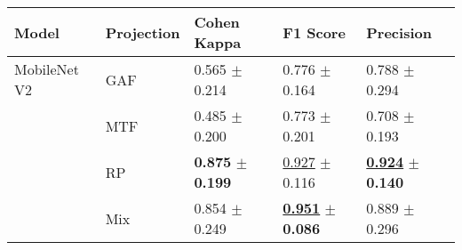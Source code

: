 
\begin{tabular}[t]{lllll}
\toprule
Model & Projection & Cohen Kappa & F1 Score & Precision \\
\midrule
MobileNet V2 & GAF & \textcolor[rgb]{0.7938511327,0.2061488673,0}{0.565} $\pm$ \textcolor[rgb]{0.2952684545,0.5000000000,0}{0.214} & \textcolor[rgb]{0.9821283509,0.0178716491,0}{0.776} $\pm$ \textcolor[rgb]{0.6787537060,0.3212462940,0}{0.164} & \textcolor[rgb]{0.6304985337,0.3695014663,0}{0.788} $\pm$ \textcolor[rgb]{0.9899538679,0.0100461321,0}{0.294} \\
 & MTF & \textcolor[rgb]{1.0000000000,0.0000000000,0}{0.485} $\pm$ \textcolor[rgb]{0.0127390111,0.5000000000,0}{0.200} & \textcolor[rgb]{1.0000000000,0.0000000000,0}{0.773} $\pm$ \textcolor[rgb]{1.0000000000,0.0000000000,0}{0.201} & \textcolor[rgb]{1.0000000000,0.0000000000,0}{0.708} $\pm$ \textcolor[rgb]{0.3412279401,0.5000000000,0}{0.193} \\
 & RP & \textbf{\textcolor[rgb]{0.0000000000,0.5000000000,0}{0.875}} $\pm$ \textbf{\textcolor[rgb]{0.0000000000,0.5000000000,0}{0.199}} & \underline{\textcolor[rgb]{0.1332250203,0.5000000000,0}{0.927}} $\pm$ \textcolor[rgb]{0.2595217982,0.5000000000,0}{0.116} & \underline{\textbf{\textcolor[rgb]{0.0000000000,0.5000000000,0}{0.924}}} $\pm$ \textbf{\textcolor[rgb]{0.0000000000,0.5000000000,0}{0.140}} \\
 & Mix & \textcolor[rgb]{0.0533980583,0.5000000000,0}{0.854} $\pm$ \textcolor[rgb]{1.0000000000,0.0000000000,0}{0.249} & \underline{\textbf{\textcolor[rgb]{0.0000000000,0.5000000000,0}{0.951}}} $\pm$ \textbf{\textcolor[rgb]{0.0000000000,0.5000000000,0}{0.086}} & \textcolor[rgb]{0.1612903226,0.5000000000,0}{0.889} $\pm$ \textcolor[rgb]{1.0000000000,0.0000000000,0}{0.296} \\
\bottomrule
\end{tabular}

